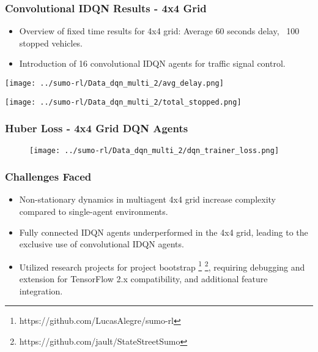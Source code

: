 \documentclass[compress,12pt]{beamer}
\begin{document}
\begin{frame}[bg=arguelles.png]
  \frametitle{Convolutional IDQN Results - 4x4 Grid}
  \begin{itemize}
    \item Overview of fixed time results for 4x4 grid: Average 60 seconds delay, ~100 stopped vehicles.
    \item Introduction of 16 convolutional IDQN agents for traffic signal control.
  \end{itemize}
  \begin{minipage}{.5\textwidth}
    \centering
    \texttt{[image: ../sumo-rl/Data\_dqn\_multi\_2/avg\_delay.png]}
  \end{minipage}%
  \begin{minipage}{.5\textwidth}
    \centering
    \texttt{[image: ../sumo-rl/Data\_dqn\_multi\_2/total\_stopped.png]}
  \end{minipage}
\end{frame}

\begin{frame}[bg=arguelles.png]
  \frametitle{Huber Loss - 4x4 Grid DQN Agents}
  \begin{figure}
    \centering
    \texttt{[image: ../sumo-rl/Data\_dqn\_multi\_2/dqn\_trainer\_loss.png]}
  \end{figure}
\end{frame}


\begin{frame}[bg=arguelles.png]
      \frametitle{Challenges Faced}
      \begin{itemize}
      \item Non-stationary dynamics in multiagent 4x4 grid increase complexity compared to single-agent environments.
      \item Fully connected IDQN agents underperformed in the 4x4 grid, leading to the exclusive use of convolutional IDQN agents.
      \item Utilized research projects for project bootstrap \footnote{https://github.com/LucasAlegre/sumo-rl} \footnote{https://github.com/jault/StateStreetSumo}, requiring debugging and extension for TensorFlow 2.x compatibility, and additional feature integration.
      \end{itemize}
\end{frame}
\end{document}
